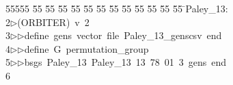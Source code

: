 %
%
\begin{tabbing}
55555 \= 55 \= 55 \= 55 \= 55 \= 55 \= 55 \= 55 \= 55 \= 55 \= 55 \= 55 \= 55 \= \>Paley\_13:\\[0pt]
2\>$\triangleright$\>(ORBITER)\ v\ 2\ \\[0pt]
3\>$\triangleright$\>$\triangleright$\>define\ gens\ vector\ file\ Paley\_13\_genscsv\ end\ \\[0pt]
4\>$\triangleright$\>$\triangleright$\>define\ G\ permutation\_group\ \\[0pt]
5\>$\triangleright$\>$\triangleright$\>bsgs\ Paley\_13\ Paley\_13\ 13\ 78\ 01\ 3\ gens\ end\ \\[0pt]
6\>\end{tabbing}
